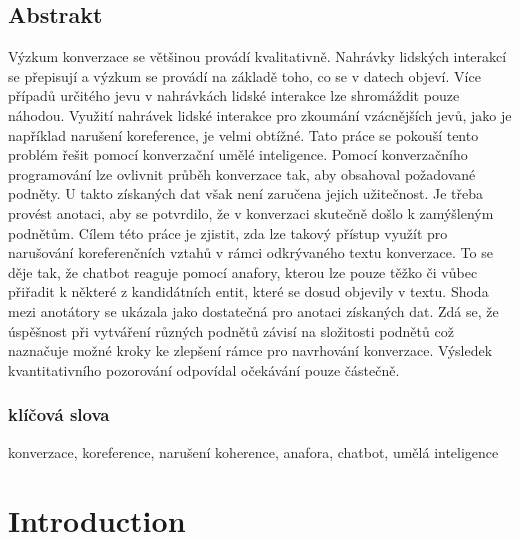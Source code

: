 \documentclass[12pt]{report}
\begin{document}
   \section*{Abstrakt}
   Výzkum konverzace se většinou provádí kvalitativně.
   Nahrávky lidských interakcí se přepisují a výzkum se provádí na základě toho, co se v datech objeví.
   Více případů určitého jevu v nahrávkách lidské interakce lze shromáždit pouze náhodou.
   Využití nahrávek lidské interakce pro
   zkoumání vzácnějších jevů, jako je například narušení koreference, je velmi obtížné.
   Tato práce se pokouší tento problém řešit pomocí konverzační umělé inteligence.
   Pomocí konverzačního programování  lze ovlivnit průběh konverzace tak,
   aby obsahoval požadované podněty.
   U takto získaných dat však není zaručena jejich užitečnost.
   Je třeba provést anotaci, aby se potvrdilo, že v konverzaci skutečně došlo k zamýšleným podnětům.
   Cílem této práce je zjistit, zda lze takový přístup využít pro narušování koreferenčních vztahů
   v rámci odkrývaného textu konverzace.
   To se děje tak, že chatbot reaguje pomocí anafory, kterou lze pouze těžko či vůbec přiřadit
   k některé z kandidátních entit, které se dosud objevily v textu.
   Shoda mezi anotátory se ukázala jako dostatečná pro anotaci získaných dat.
   Zdá se, že úspěšnost při vytváření různých podnětů závisí na složitosti podnětů
   což naznačuje možné kroky ke zlepšení rámce pro navrhování konverzace.
   Výsledek kvantitativního pozorování odpovídal očekávání pouze částečně.

   \subsection*{klíčová slova}
   konverzace, koreference, narušení koherence, anafora, chatbot, umělá inteligence


   \thispagestyle{empty}
\clearpage
\tableofcontents
\clearpage

\chapter*{Introduction}
\end{document}
